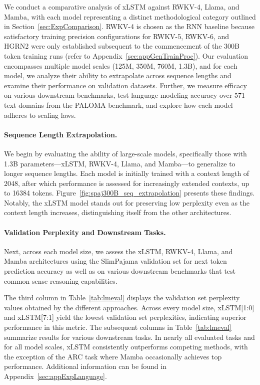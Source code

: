 We conduct a comparative analysis of xLSTM against RWKV-4, Llama, and Mamba, with each model representing a distinct methodological category outlined in Section~\ref{sec:ExpComparison}. RWKV-4 is chosen as the RNN baseline because satisfactory training precision configurations for RWKV-5, RWKV-6, and HGRN2 were only established subsequent to the commencement of the 300B token training runs (refer to Appendix~\ref{sec:appGenTrainProc}). Our evaluation encompasses multiple model scales (125M, 350M, 760M, 1.3B), and for each model, we analyze their ability to extrapolate across sequence lengths and examine their performance on validation datasets. Further, we measure efficacy on various downstream benchmarks, test language modeling accuracy over 571 text domains from the PALOMA benchmark, and explore how each model adheres to scaling laws.

\paragraph{Sequence Length Extrapolation.}
\label{sec:spaj300B_ctx_extrapolation}
We begin by evaluating the ability of large-scale models, specifically those with 1.3B parameters—xLSTM, RWKV-4, Llama, and Mamba—to generalize to longer sequence lengths. Each model is initially trained with a context length of 2048, after which performance is assessed for increasingly extended contexts, up to 16384 tokens. Figure~\ref{fig:spaj300B_seq_extrapolation} presents these findings. Notably, the xLSTM model stands out for preserving low perplexity even as the context length increases, distinguishing itself from the other architectures.

\paragraph{Validation Perplexity and Downstream Tasks.}
\label{sec:spaj_downstream_eval}
Next, across each model size, we assess the xLSTM, RWKV-4, Llama, and Mamba architectures using the SlimPajama validation set for next token prediction accuracy as well as on various downstream benchmarks that test common sense reasoning capabilities.

The third column in Table~\ref{tab:lmeval} displays the validation set perplexity values obtained by the different approaches. Across every model size, xLSTM[1:0] and xLSTM[7:1] yield the lowest validation set perplexities, indicating superior performance in this metric. The subsequent columns in Table~\ref{tab:lmeval} summarize results for various downstream tasks. In nearly all evaluated tasks and for all model scales, xLSTM consistently outperforms competing methods, with the exception of the ARC task where Mamba occasionally achieves top performance. Additional information can be found in Appendix~\ref{sec:appExpLanguage}.

